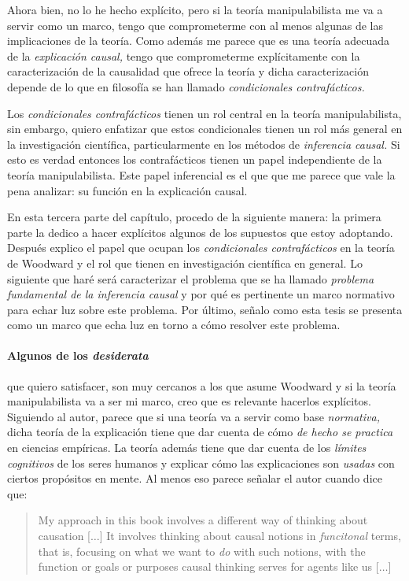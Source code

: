 Ahora bien, no lo he hecho explícito, pero si la teoría
manipulabilista me va a servir como un marco, tengo que
comprometerme con al menos algunas de las implicaciones de
la teoría. Como además me parece que es una teoría adecuada
de la \emph{explicación causal,} tengo que comprometerme
explícitamente con la caracterización de la causalidad que
ofrece la teoría y dicha caracterización depende de lo que
en filosofía se han llamado \emph{condicionales
contrafácticos.}

Los \emph{condicionales contrafácticos} tienen un rol
central en la teoría manipulabilista, sin embargo, quiero
enfatizar que estos condicionales tienen un rol más general
en la investigación científica, particularmente en los
métodos de \emph{inferencia causal.} Si esto es verdad
entonces los contrafácticos tienen un papel independiente de
la teoría manipulabilista. Este papel inferencial es el
que que me parece que vale la pena analizar: su función
en la explicación causal.

En esta tercera parte del capítulo, procedo de la siguiente
manera: la primera parte la dedico a hacer explícitos
algunos de los supuestos que estoy adoptando. Después explico el papel que
ocupan los \emph{condicionales contrafácticos} en la teoría
de Woodward y el rol que tienen en investigación científica
en general. Lo siguiente que haré será caracterizar el
problema que se ha llamado \emph{problema fundamental de la
inferencia causal} y por qué es pertinente un marco
normativo para echar luz sobre este problema. Por último, señalo como esta tesis se presenta como
un marco que echa luz en torno a cómo resolver este
problema.

\paragraph{Algunos de los \emph{desiderata}} que quiero
satisfacer,  son muy cercanos a los que asume Woodward y si
la teoría manipulabilista va a ser mi marco, creo que es
relevante hacerlos explícitos. Siguiendo al autor, parece
que si una teoría va a servir como base \emph{normativa,}
dicha teoría de la explicación tiene que dar cuenta de cómo
\emph{de hecho se practica} en ciencias empíricas. La teoría
además tiene que dar cuenta de los \emph{límites cognitivos}
de los seres humanos y explicar cómo las explicaciones son
\emph{usadas} con ciertos propósitos en mente. Al menos eso
parece señalar el autor cuando dice que:

\begin{quote}
  My approach in this book involves a different way of
  thinking about causation [$\ldots$] It involves thinking
  about causal notions in \emph{funcitonal} terms, that is,
  focusing on what we want to \emph{do} with such notions,
  with the function or goals or purposes causal thinking
  serves for agents like us [$\ldots$] \parencite[Énfasis en
  el original,][p.~18]{caushuman}
\end{quote}


